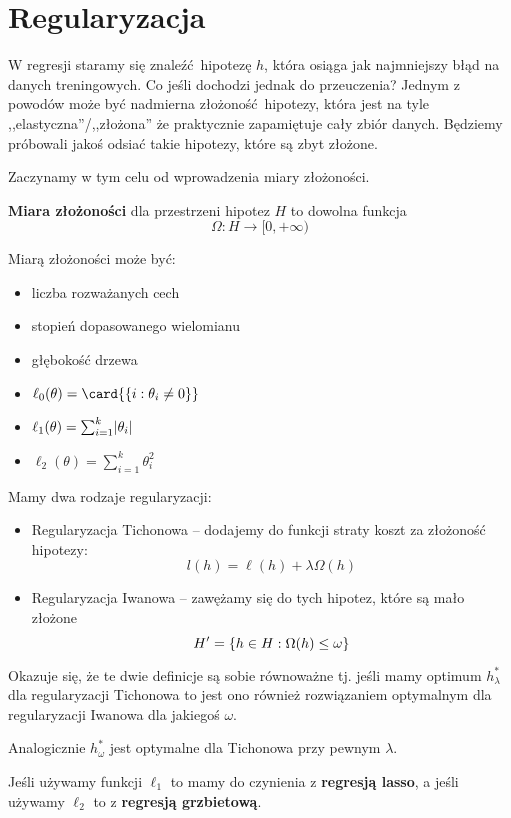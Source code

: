 \chapter{Regularyzacja}

W regresji staramy się znaleźć hipotezę \( h \), która osiąga jak najmniejszy błąd na danych treningowych. Co jeśli dochodzi jednak do przeuczenia?
Jednym z powodów może być nadmierna złożoność hipotezy, która jest na tyle ,,elastyczna''/,,złożona'' że praktycznie zapamiętuje cały zbiór danych.
Będziemy próbowali jakoś odsiać takie hipotezy, które są zbyt złożone.

Zaczynamy w tym celu od wprowadzenia miary złożoności.
\begin{definition}
	\textbf{Miara złożoności} dla przestrzeni hipotez \( H \)
	to dowolna funkcja
	\[
		\Omega : H \rightarrow [0, +\infty)
	\]
\end{definition}
Miarą złożoności może być:
\begin{itemize}
	\item liczba rozważanych cech
	\item stopień dopasowanego wielomianu
	\item głębokość drzewa
	\item \( \ell_0(\theta) = \card{\set{i : \theta_i \neq 0}} \)
	\item \( \ell_1(\theta) = \sum_{i=1}^k \abs{\theta_i} \)
	\item \( \ell_2(\theta) = \sum_{i=1}^k \theta_i^2 \)
\end{itemize}

Mamy dwa rodzaje regularyzacji:
\begin{itemize}
	\item Regularyzacja Tichonowa -- dodajemy do funkcji straty koszt za złożoność hipotezy:
	      \[
		      l(h) = \ell(h) + \lambda \Omega(h)
	      \]

	\item Regularyzacja Iwanowa -- zawężamy się do tych hipotez, które są mało złożone
	      \[
		      H' = \set{h \in H : \Omega(h) \leq \omega}
	      \]
\end{itemize}

Okazuje się, że te dwie definicje są sobie równoważne tj. jeśli mamy optimum \( h^*_\lambda \) dla regularyzacji Tichonowa to jest ono również rozwiązaniem optymalnym dla regularyzacji Iwanowa dla jakiegoś \( \omega \).

Analogicznie \( h^*_\omega \) jest optymalne dla Tichonowa przy pewnym \( \lambda \).

Jeśli używamy funkcji \( \ell_1 \) to mamy do czynienia z \textbf{regresją lasso}, a jeśli używamy \( \ell_2 \) to z \textbf{regresją grzbietową}.